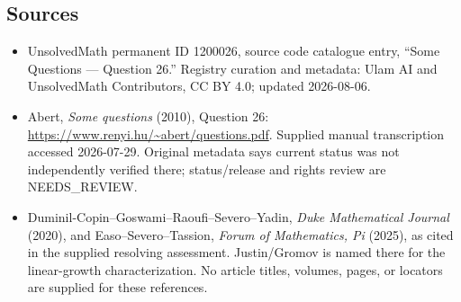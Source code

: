 \documentclass[11pt]{article}
\begin{document}
\subsection{Sources}
\begin{itemize}
\item UnsolvedMath permanent ID 1200026, source code catalogue entry, ``Some Questions --- Question 26.'' Registry curation and metadata: Ulam AI and UnsolvedMath Contributors, CC BY 4.0; updated 2026-08-06.
\item Abert, \emph{Some questions} (2010), Question 26: \url{https://www.renyi.hu/~abert/questions.pdf}. Supplied manual transcription accessed 2026-07-29. Original metadata says current status was not independently verified there; status/release and rights review are NEEDS\_REVIEW.
\item Duminil-Copin--Goswami--Raoufi--Severo--Yadin, \emph{Duke Mathematical Journal} (2020), and Easo--Severo--Tassion, \emph{Forum of Mathematics, Pi} (2025), as cited in the supplied resolving assessment. Justin/Gromov is named there for the linear-growth characterization. No article titles, volumes, pages, or locators are supplied for these references.
\end{itemize}
\end{document}
